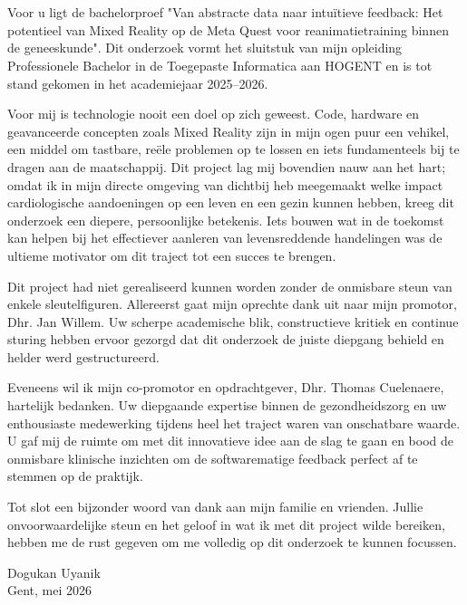 
\chapter*{}%
\label{ch:voorwoord}

Voor u ligt de bachelorproef "Van abstracte data naar intuïtieve feedback: Het potentieel van Mixed Reality op de Meta Quest voor reanimatietraining binnen de geneeskunde". 
Dit onderzoek vormt het sluitstuk van mijn opleiding Professionele Bachelor in de Toegepaste Informatica aan HOGENT en is tot stand gekomen in het academiejaar 2025--2026.

Voor mij is technologie nooit een doel op zich geweest. Code, hardware en geavanceerde concepten zoals Mixed Reality zijn in mijn ogen puur een vehikel, 
een middel om tastbare, reële problemen op te lossen en iets fundamenteels bij te dragen aan de maatschappij. Dit project lag mij bovendien nauw aan het hart; omdat ik in 
mijn directe omgeving van dichtbij heb meegemaakt welke impact cardiologische aandoeningen op een leven en een gezin kunnen hebben, kreeg dit onderzoek een diepere, 
persoonlijke betekenis. Iets bouwen wat in de toekomst kan helpen bij het effectiever aanleren van levensreddende handelingen was de ultieme motivator om 
dit traject tot een succes te brengen.

Dit project had niet gerealiseerd kunnen worden zonder de onmisbare steun van enkele sleutelfiguren. Allereerst gaat mijn oprechte dank uit naar mijn promotor, 
Dhr. Jan Willem. Uw scherpe academische blik, constructieve kritiek en continue sturing hebben ervoor gezorgd dat dit onderzoek de juiste diepgang behield en 
helder werd gestructureerd.

Eveneens wil ik mijn co-promotor en opdrachtgever, Dhr. Thomas Cuelenaere, hartelijk bedanken. Uw diepgaande expertise binnen de gezondheidszorg en uw enthousiaste 
medewerking tijdens heel het traject waren van onschatbare waarde. U gaf mij de ruimte om met dit innovatieve idee aan de slag te gaan en bood de onmisbare klinische 
inzichten om de softwarematige feedback perfect af te stemmen op de praktijk.

Tot slot een bijzonder woord van dank aan mijn familie en vrienden. Jullie onvoorwaardelijke steun en het geloof in wat ik met dit project wilde bereiken, 
hebben me de rust gegeven om me volledig op dit onderzoek te kunnen focussen.

\vspace{1.0cm}

\noindent Dogukan Uyanik\\
Gent, mei 2026
